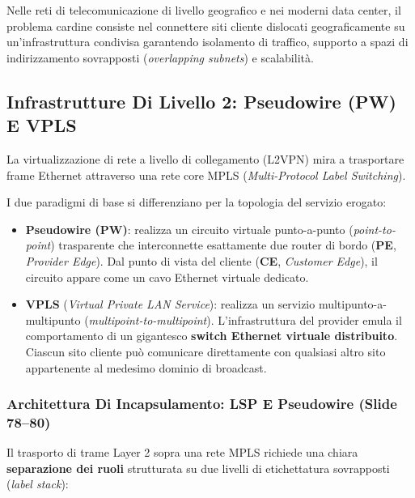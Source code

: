 \documentclass[11pt, a4paper]{article}
\begin{document}
Nelle reti di telecomunicazione di livello geografico e nei moderni data center, il problema cardine consiste nel connettere siti cliente dislocati geograficamente su un'infrastruttura condivisa garantendo isolamento di traffico, supporto a spazi di indirizzamento sovrapposti (\emph{overlapping subnets}) e scalabilità.

\subsection{Infrastrutture Di Livello 2: Pseudowire (PW) E VPLS}

La virtualizzazione di rete a livello di collegamento (L2VPN) mira a trasportare frame Ethernet attraverso una rete core MPLS (\emph{Multi-Protocol Label Switching}).


I due paradigmi di base si differenziano per la topologia del servizio erogato:
\begin{itemize}
    \item \textbf{Pseudowire (PW)}: realizza un circuito virtuale punto-a-punto (\emph{point-to-point}) trasparente che interconnette esattamente due router di bordo (\textbf{PE}, \emph{Provider Edge}). Dal punto di vista del cliente (\textbf{CE}, \emph{Customer Edge}), il circuito appare come un cavo Ethernet virtuale dedicato.
    \item \textbf{VPLS} (\emph{Virtual Private LAN Service}): realizza un servizio multipunto-a-multipunto (\emph{multipoint-to-multipoint}). L'infrastruttura del provider emula il comportamento di un gigantesco \textbf{switch Ethernet virtuale distribuito}. Ciascun sito cliente può comunicare direttamente con qualsiasi altro sito appartenente al medesimo dominio di broadcast.
\end{itemize}

\subsubsection{Architettura Di Incapsulamento: LSP E Pseudowire (Slide 78--80)}
Il trasporto di trame Layer 2 sopra una rete MPLS richiede una chiara \textbf{separazione dei ruoli} strutturata su due livelli di etichettatura sovrapposti (\emph{label stack}):

\end{document}
